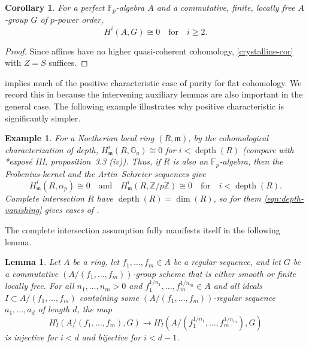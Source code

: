 \documentclass[11pt, reqno]{amsart}
\newcommand{\gA}{\alpha}
\newcommand{\bF}{\mathbb{F}}
\newcommand{\bG}{\mathbb{G}}
\newcommand{\bM}{\mathbb{M}}
\newcommand{\bZ}{\mathbb{Z}}
\newcommand{\fm}{\mathfrak{m}}
\DeclareMathOperator{\depth}{depth}	%
\newcommand{\ra}{\rightarrow}
\newcommand{\blem}{\begin{lemma}}
\newcommand{\elem}{\end{lemma}}
\newcommand{\beg}{\begin{eg}}
\newcommand{\eeg}{\end{eg}}
\newcommand{\x}{\text}
\providecommand{\qxq}[1]{\quad\text{#1}\quad}
\newcommand{\q}{\quad}
\newcommand{\be}{\begin{equation}}
\newcommand{\ee}{\end{equation}}
\newcommand{\bpf}{\begin{proof}}
\newcommand{\epf}{\end{proof}}
\newcommand{\bcor}{\begin{cor}}
\newcommand{\ecor}{\end{cor}}
\numberwithin{equation}{numberingbase}
\theoremstyle{thms}
\newtheorem{cor}[numberingbase]{Corollary}
\newtheorem{lemma}[numberingbase]{Lemma}
\theoremstyle{claims}
\theoremstyle{defs}
\newtheorem{eg}[numberingbase]{Example}
\theoremstyle{thms}
\theoremstyle{defs}
\theoremstyle{subsection-tweak}
\theoremstyle{subsection-tweak}
\begin{document}
\bcor \label{cor:perfect-vanish}
For a perfect $\bF_p$-algebra $A$ and a commutative, finite, locally free $A$-group $G$ of $p$-power order, 
\[
H^i(A, G) \cong 0 \qxq{for} i \ge 2.
\]
\ecor

\bpf
Since affines have no higher quasi-coherent cohomology, \eqref{crystalline-cor} with $Z = S$ suffices. %
\epf




 implies much of the positive characteristic case of purity for flat cohomology. We record this in  because the intervening auxiliary lemmas are also important in the general case. The following example illustrates why positive characteristic is significantly simpler.



\beg \label{eg:depth-example}
For a Noetherian local ring $(R, \fm)$, by the cohomological characterization of depth, $H^i_\fm(R, \bG_a) \cong 0$ for $i < \depth(R)$ (compare with \cite{SGA2new}*{expos\'{e} III, proposition~3.3 (iv)}). Thus, if $R$ is also an $\bF_p$-algebra, then the Frobenius-kernel and the Artin--Schreier sequences give %
\be \label{eqn:depth-vanishing}
H^i_\fm(R, \gA_p) \cong 0 \qxq{and} H^i_\fm(R, \bZ/p\bZ) \cong 0 \q \x{for} \q i < \depth(R).
\ee
Complete intersection $R$ have $\depth(R) = \dim(R)$, so for them \eqref{eqn:depth-vanishing} gives cases of . 
\eeg


The complete intersection assumption fully manifests itself in the following lemma.

\blem \label{mod-out-by-more}
Let $A$ be a ring, let $f_1, \dotsc, f_m \in A$ be a regular sequence, and let $G$ be a commutative $(A/(f_1, \dotsc, f_m))$-group scheme that is either smooth or finite locally free. For all $n_1, \dotsc, n_m > 0$ and $f_1^{1/n_1}, \dotsc, f_m^{1/n_m} \in A$ and all ideals $I \subset A/(f_1, \dotsc, f_m)$ containing some $(A/(f_1, \dotsc, f_m))$-regular sequence $a_1, \dotsc, a_d$ of length $d$, the map
\[
H^i_I(A/(f_1, \dotsc, f_m), G) \ra H^i_I(A/(f_1^{1/n_1}, \dotsc, f_m^{1/n_m}), G) 
\]  %
is injective for $i < d$ and bijective for $i < d - 1$.
\elem
\end{document}
